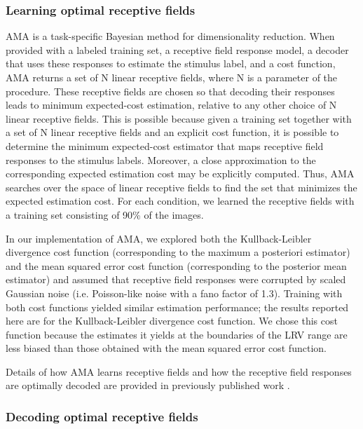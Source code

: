 \documentclass{jov}
\begin{document}
\subsubsection*{Learning optimal receptive fields}
AMA is a task-specific Bayesian method for dimensionality reduction.
When provided with a labeled training set, a receptive field response model, a decoder that uses these responses to estimate the stimulus label, and a cost function, AMA returns a set of N linear receptive fields, where N is a parameter of the procedure.
These receptive fields are chosen so that decoding their responses leads to minimum expected-cost estimation, relative to any other choice of N linear receptive fields.
This is possible because given a training set together with a set of N linear receptive fields and an explicit cost function, it is possible to determine the minimum expected-cost estimator that maps receptive field responses to the stimulus labels.
Moreover, a close approximation to the corresponding expected estimation cost may be explicitly computed.
Thus, AMA searches over the space of linear receptive fields to find the set that minimizes the expected estimation cost.
For each condition, we learned the receptive fields with a training set consisting of 90\% of the images.

In our implementation of AMA, we explored both the Kullback-Leibler divergence cost function (corresponding to the maximum a posteriori estimator) and the mean squared error cost function (corresponding to the posterior mean estimator) and assumed that receptive field responses were corrupted by scaled Gaussian noise (i.e. Poisson-like noise with a fano factor of 1.3).
Training with both cost functions yielded similar estimation performance; the results reported here are for the Kullback-Leibler divergence cost function.
We chose this cost function because the estimates it yields at the boundaries of the LRV range are less biased than those obtained with the mean squared error cost function.

Details of how AMA learns receptive fields and how the receptive field responses are optimally decoded are provided in previously published work \cite{geisler2009optimal,burge2017accuracy,jaini2017linking}.

\subsubsection*{Decoding optimal receptive fields}
\end{document}
